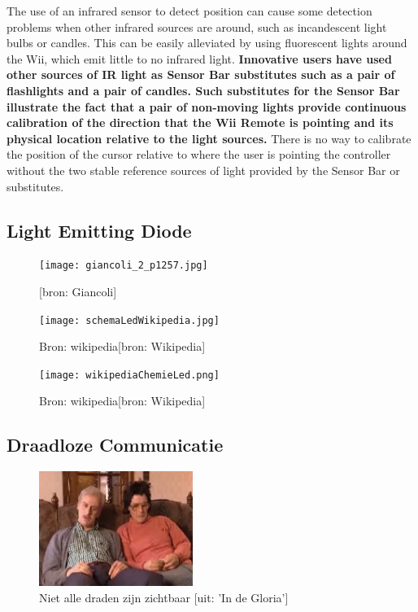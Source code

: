 \documentclass[11pt]{article}
\begin{document}
The use of an infrared sensor to detect position can cause some detection problems when other infrared sources are around, such as incandescent light bulbs or candles. This can be easily alleviated by using fluorescent lights around the Wii, which emit little to no infrared light. \textbf{Innovative users have used other sources of IR light as Sensor Bar substitutes such as a pair of flashlights and a pair of candles. Such substitutes for the Sensor Bar illustrate the fact that a pair of non-moving lights provide continuous calibration of the direction that the Wii Remote is pointing and its physical location relative to the light sources.} There is no way to calibrate the position of the cursor relative to where the user is pointing the controller without the two stable reference sources of light provided by the Sensor Bar or substitutes. \\

\newpage

\subsection{Light Emitting Diode}

\begin{figure}[h]
\begin{center}
\texttt{[image: giancoli\_2\_p1257.jpg]}
\caption{[bron: Giancoli]}
\end{center}
\end{figure}

\begin{figure}[h]
\begin{center}
\texttt{[image: schemaLedWikipedia.jpg]}
\caption{Bron: wikipedia[bron: Wikipedia]}
\end{center}
\end{figure}

\begin{figure}[h]
\begin{center}
\texttt{[image: wikipediaChemieLed.png]}
\caption{Bron: wikipedia[bron: Wikipedia]}
\end{center}
\end{figure}

\newpage

\subsection{Draadloze Communicatie}

\begin{figure}[h]
\begin{center}
\includegraphics[width=5cm]{inDeGloriaDenDraad.jpg}
\caption{Niet alle draden zijn zichtbaar [uit: 'In de Gloria']}
\end{center}
\end{figure}
\end{document}
